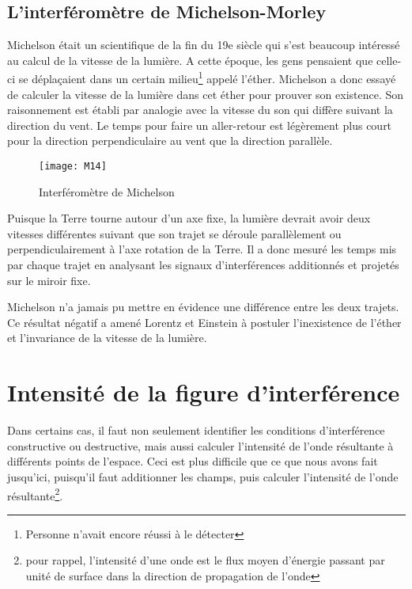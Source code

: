 \subsection{L'interféromètre de Michelson-Morley}

Michelson était un scientifique de la fin du 19e siècle qui s'est beaucoup intéressé au calcul de la vitesse de la lumière. A cette époque, les gens pensaient que celle-ci se déplaçaient dans un certain milieu\footnote{Personne n'avait encore réussi à le détecter} appelé l'éther. Michelson a donc essayé de calculer la vitesse de la lumière dans cet éther pour prouver son existence. Son raisonnement est établi par analogie avec la vitesse du son qui diffère suivant la direction du vent. Le temps pour faire un aller-retour est légèrement plus court pour la direction perpendiculaire au vent que la direction parallèle. 

\begin{figure}[htb]
\centering
\texttt{[image: M14]}
\caption{Interféromètre de Michelson}
\label{fig:Michelson}
\end{figure}

Puisque la Terre tourne autour d'un axe fixe, la lumière devrait avoir deux vitesses différentes suivant que son trajet se déroule parallèlement ou perpendiculairement à l'axe rotation de la Terre.  Il a donc mesuré les temps mis par chaque trajet en analysant les signaux d'interférences additionnés et projetés sur le miroir fixe.

Michelson n'a jamais pu mettre en évidence une différence entre les deux trajets. Ce résultat négatif a amené Lorentz et Einstein à postuler l'inexistence de l'éther et l'invariance de la vitesse de la lumière.


\section{Intensité de la figure d'interférence}

Dans certains cas, il faut non seulement identifier les conditions d'interférence constructive ou destructive, mais aussi calculer l'intensité de l'onde résultante à différents points de l'espace. Ceci est plus difficile que ce que nous avons fait jusqu'ici, puisqu'il faut additionner les champs, puis calculer l'intensité de l'onde résultante\footnote{pour rappel, l'intensité d'une onde est le flux moyen d'énergie passant par unité de surface dans la direction de propagation de l'onde}.

